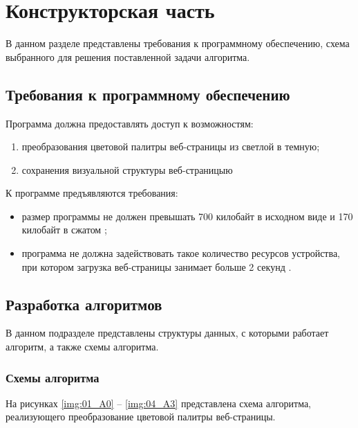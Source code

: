 \chapter{Конструкторская часть}

В данном разделе представлены требования к программному обеспечению, схема выбранного для решения поставленной задачи алгоритма.

\section{Требования к программному обеспечению}

Программа должна предоставлять доступ к возможностям:
\begin{enumerate}[label={\arabic*)}]
	\item преобразования цветовой палитры веб-страницы из светлой в темную;
	\item сохранения визуальной структуры веб-страницыю
\end{enumerate}

К программе предъявляются требования:
\begin{itemize}
	\item размер программы не должен превышать 700 килобайт в исходном виде и 170 килобайт в сжатом \cite{jscost};
	\item программа не должна задействовать такое количество ресурсов устройства, при котором загрузка веб-страницы занимает больше 2 секунд \cite{siteload}.
\end{itemize}

\section{Разработка алгоритмов}

В данном подразделе представлены структуры данных, с которыми работает алгоритм, а также схемы алгоритма.

\subsection{Схемы алгоритма}

На рисунках \ref{img:01_A0} -- \ref{img:04_A3} представлена схема алгоритма, реализующего преобразование цветовой палитры веб-страницы.


